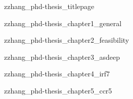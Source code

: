 \documentclass[10pt]{book}
\begin{document}
% 


{zzhang_phd-thesis_titlepage}






\tableofcontents
\clearpage




{zzhang_phd-thesis_chapter1_general}


{zzhang_phd-thesis_chapter2_feasibility}


{zzhang_phd-thesis_chapter3_asdeep}


{zzhang_phd-thesis_chapter4_irf7}


{zzhang_phd-thesis_chapter5_ccr5}
\end{document}

